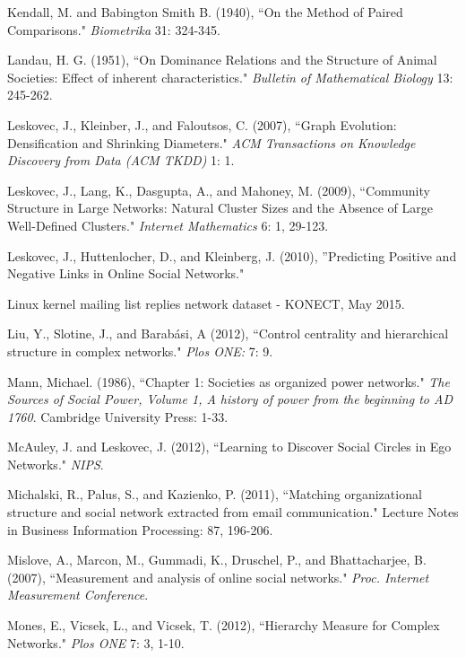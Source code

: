 \documentclass[3p,times]{elsarticle}
\begin{document}
\begin{thebibliography}{9}
	Kendall, M. and Babington Smith B. (1940),
	``On the Method of Paired Comparisons." 
	\textit{Biometrika} 31: 324-345.
	
	Landau, H. G. (1951),
	``On Dominance Relations and the Structure of Animal Societies:  Effect of inherent characteristics." 
	\textit{Bulletin of Mathematical Biology} 13: 245-262.

	Leskovec, J., Kleinber, J., and Faloutsos, C. (2007),
	``Graph Evolution: Densification and Shrinking Diameters."
	\textit{ACM Transactions on Knowledge Discovery from Data (ACM TKDD)} 1: 1.

	Leskovec, J., Lang, K., Dasgupta, A., and Mahoney, M. (2009),
	``Community Structure in Large Networks: Natural Cluster Sizes and the Absence of Large Well-Defined Clusters."
	\textit{Internet Mathematics} 6: 1, 29-123.

	Leskovec, J., Huttenlocher, D., and Kleinberg, J. (2010),
	''Predicting Positive and Negative Links in Online Social Networks."
	
	Linux kernel mailing list replies network dataset - KONECT, May 2015.

	Liu, Y., Slotine, J., and Barab{\'a}si, A (2012),
	``Control centrality and hierarchical structure in complex networks."
	\textit{Plos ONE:} 7: 9.
	
	Mann, Michael. (1986), ``Chapter 1: Societies as organized power networks."
	\textit{The Sources of Social Power, Volume 1, A history of power from the beginning to AD 1760}. Cambridge University Press: 1-33.
	
	McAuley, J. and Leskovec, J. (2012),
	``Learning to Discover Social Circles in Ego Networks."	\textit{NIPS}.
	
	Michalski, R., Palus, S., and Kazienko, P. (2011),
	``Matching organizational structure and social network extracted from email communication."
	Lecture Notes in Business Information Processing: 87, 196-206.
	
	Mislove, A., Marcon, M., Gummadi, K., Druschel, P., and Bhattacharjee, B. (2007),
	``Measurement and analysis of online social networks."
	\textit{Proc. Internet Measurement Conference}.
	
	Mones, E., Vicsek, L., and Vicsek, T. (2012),
	``Hierarchy Measure for Complex Networks." 
	\textit{Plos ONE} 7: 3, 1-10.	
	

\end{thebibliography}
\end{document}
